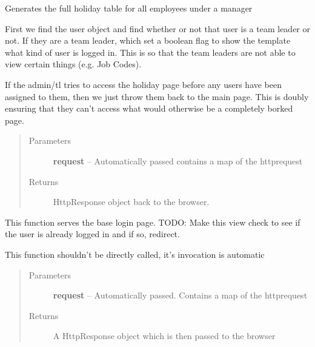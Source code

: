 \documentclass[letterpaper,10pt,english]{sphinxmanual}
\begin{document}

\begin{fulllineitems}
\label{timetracker:timetracker.views.holiday_planning}
Generates the full holiday table for all employees under a manager

First we find the user object and find whether or not that user is a team
leader or not. If they are a team leader, which set a boolean flag to show
the template what kind of user is logged in. This is so that the team
leaders are not able to view certain things (e.g. Job Codes).

If the admin/tl tries to access the holiday page before any users have
been assigned to them, then we just throw them back to the main page. This
is doubly ensuring that they can't access what would otherwise be a
completely borked page.
\begin{quote}\begin{description}
\item[{Parameters}] \leavevmode
\textbf{request} -- Automatically passed contains a map of the httprequest

\item[{Returns}] \leavevmode
HttpResponse object back to the browser.

\end{description}\end{quote}

\end{fulllineitems}


\begin{fulllineitems}
\label{timetracker:timetracker.views.index}
This function serves the base login page. TODO: Make this view check
to see if the user is already logged in and if so, redirect.

This function shouldn't be directly called, it's invocation is automatic
\begin{quote}\begin{description}
\item[{Parameters}] \leavevmode
\textbf{request} -- Automatically passed. Contains a map of the httprequest

\item[{Returns}] \leavevmode
A HttpResponse object which is then passed to the browser

\end{description}\end{quote}

\end{fulllineitems}
\end{document}
